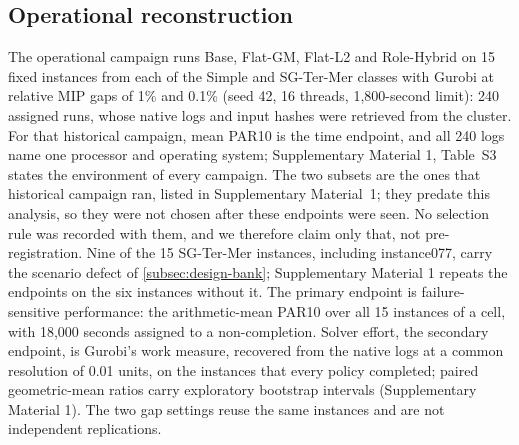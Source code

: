 \documentclass[11pt]{article}
\theoremstyle{definition}
\theoremstyle{remark}
\begin{document}
\subsection{Operational reconstruction}
\label{subsec:design-operational}
The operational campaign runs Base, Flat-GM, Flat-L2 and Role-Hybrid on 15 fixed instances from
each of the Simple and SG-Ter-Mer classes with Gurobi at relative MIP gaps of 1\% and 0.1\%
(seed 42, 16 threads, 1,800-second limit): 240 assigned runs, whose native logs and input
hashes were retrieved from the cluster. For that historical campaign, mean PAR10 is the time endpoint, and all 240 logs name one processor and operating system; Supplementary Material 1,
Table~S3 states the environment of every campaign. The two subsets are the ones that historical campaign ran, listed in Supplementary Material~1;
they predate this analysis, so they were not chosen after these endpoints were seen. No
selection rule was recorded with them, and we therefore claim only that, not
pre-registration. Nine of the 15 SG-Ter-Mer instances, including instance077, carry the scenario defect of
\cref{subsec:design-bank}; Supplementary Material 1 repeats the endpoints on the six instances
without it.
The primary endpoint is failure-sensitive performance: the arithmetic-mean PAR10
over all 15 instances of a cell, with 18,000 seconds assigned to a non-completion. Solver effort,
the secondary endpoint, is Gurobi's work measure, recovered from the native logs at a common
resolution of 0.01 units, on the instances that every policy completed; paired geometric-mean
ratios carry exploratory bootstrap intervals (Supplementary Material 1). The two gap settings reuse the same instances and are not independent
replications.


\end{document}
